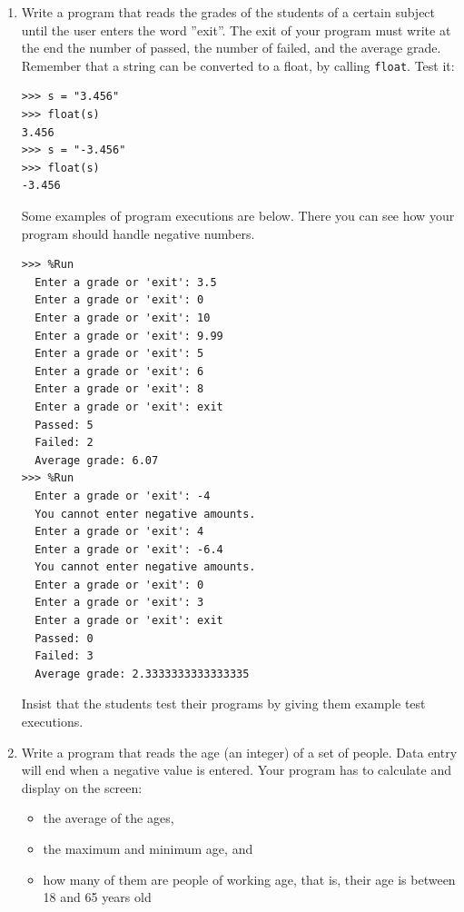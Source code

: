 \documentclass[
  fontsize=10pt,
  a4paper,
]{scrartcl}
\newenvironment{howTILEd}%
  {\begin{mdframed}[skipabove=10pt,skipbelow=10pt,backgroundcolor=pink!40]}%
  {\end{mdframed}}
\begin{document}
\begin{enumerate}
\item Write a program that reads the grades of the students of a certain
subject until the user enters the word ''exit''. The exit of your program must write at the end the number of passed, the number of failed, and the average grade. Remember that a string can be converted to a float, by calling \verb+float+. Test it:


\begin{Verbatim}[frame=single, label={\em examples of test executions}]
>>> s = "3.456"
>>> float(s)
3.456
>>> s = "-3.456"
>>> float(s)
-3.456
\end{Verbatim} 

Some examples of program executions are below. There you can see how your program should handle negative numbers.

\begin{Verbatim}[frame=single, label={\em examples of test executions}]
>>> %Run 
  Enter a grade or 'exit': 3.5
  Enter a grade or 'exit': 0
  Enter a grade or 'exit': 10
  Enter a grade or 'exit': 9.99
  Enter a grade or 'exit': 5
  Enter a grade or 'exit': 6
  Enter a grade or 'exit': 8
  Enter a grade or 'exit': exit
  Passed: 5
  Failed: 2
  Average grade: 6.07
>>> %Run 
  Enter a grade or 'exit': -4
  You cannot enter negative amounts.
  Enter a grade or 'exit': 4
  Enter a grade or 'exit': -6.4
  You cannot enter negative amounts.
  Enter a grade or 'exit': 0
  Enter a grade or 'exit': 3
  Enter a grade or 'exit': exit
  Passed: 0
  Failed: 3
  Average grade: 2.3333333333333335  
\end{Verbatim} 

\begin{howTILEd}
Insist that the students test their programs by giving them example test executions.
\end{howTILEd}




\item Write a program that reads the age (an integer) of a set of people. Data entry will end when a negative value is entered. Your program has to calculate and display on the screen:

\begin{itemize}
\item the average of the ages, 
\item the maximum and minimum age, and
\item how many of them are people of working age, that is, their age is between 18 and 65 years old
\end{itemize}


\end{enumerate}
\end{document}
